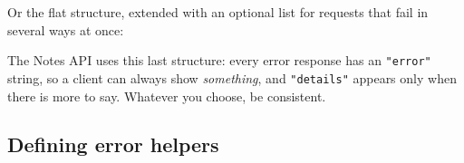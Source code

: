 \noindent{}Or the flat structure, extended with an optional list for requests that fail in several ways at once:

\begin{codebox}[short]

\begin{Shaded}
\begin{Highlighting}[]
\NormalTok{                             "details": ["\textquotesingle{}content\textquotesingle{} is required",}
\NormalTok{                                         "\textquotesingle{}priority\textquotesingle{} is required"]\}}
\end{Highlighting}
\end{Shaded}

\end{codebox}

\noindent{}The Notes API uses this last structure: every error response has an \texttt{"error"} string, so a client can always show \emph{something}, and \texttt{"details"} appears only when there is more to say. Whatever you choose, be consistent.

\subsection*{Defining error helpers}\label{34-response-handling:defining-error-helpers}

